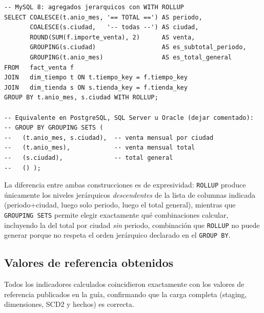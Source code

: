 \documentclass[11pt,a4paper]{article}
\begin{document}
\begin{lstlisting}[caption={Materialización del cubo con \texttt{WITH ROLLUP} en MySQL 8 (\texttt{dm\_mercandina\_olap.sql}).}, label={lst:rollup}]
-- MySQL 8: agregados jerarquicos con WITH ROLLUP
SELECT COALESCE(t.anio_mes, '== TOTAL ==') AS periodo,
       COALESCE(s.ciudad,   '-- todas --') AS ciudad,
       ROUND(SUM(f.importe_venta), 2)      AS venta,
       GROUPING(s.ciudad)                  AS es_subtotal_periodo,
       GROUPING(t.anio_mes)                AS es_total_general
FROM   fact_venta f
JOIN   dim_tiempo t ON t.tiempo_key = f.tiempo_key
JOIN   dim_tienda s ON s.tienda_key = f.tienda_key
GROUP BY t.anio_mes, s.ciudad WITH ROLLUP;

-- Equivalente en PostgreSQL, SQL Server u Oracle (dejar comentado):
-- GROUP BY GROUPING SETS (
--   (t.anio_mes, s.ciudad),  -- venta mensual por ciudad
--   (t.anio_mes),            -- venta mensual total
--   (s.ciudad),              -- total general
--   () );
\end{lstlisting}

La diferencia entre ambas construcciones es de expresividad: \texttt{ROLLUP} produce únicamente los niveles jerárquicos \emph{descendentes} de la lista de columnas indicada (periodo+ciudad, luego solo periodo, luego el total general), mientras que \texttt{GROUPING SETS} permite elegir exactamente qué combinaciones calcular, incluyendo la del total por ciudad \emph{sin} periodo, combinación que \texttt{ROLLUP} no puede generar porque no respeta el orden jerárquico declarado en el \texttt{GROUP BY}.

\subsection{Valores de referencia obtenidos}

Todos los indicadores calculados coincidieron exactamente con los valores de referencia publicados en la guía, confirmando que la carga completa (staging, dimensiones, SCD2 y hechos) es correcta.
\end{document}
